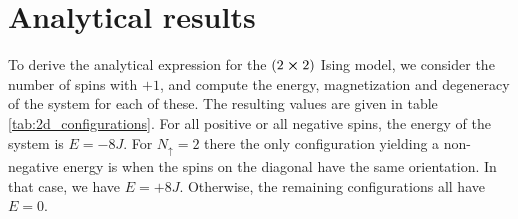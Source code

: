 \appendix 

\section{Analytical results} \label{app:analytical_expressions}
To derive the analytical expression for the $(2\cross2)$ Ising model, we consider the number of spins with $+1$, and compute the energy, magnetization and degeneracy of the system for each of these. The resulting values are given in table \ref{tab:2d_configurations}. For all positive or all negative spins, the energy of the system is $E=-8J$. For $N_\uparrow=2$ there the only configuration yielding a non-negative energy is when the spins on the diagonal have the same orientation. In that case, we have $E=+8J$. Otherwise, the remaining configurations all have $E=0$.    

